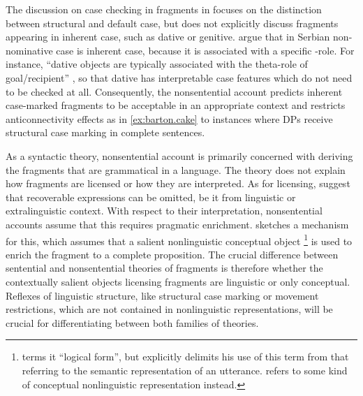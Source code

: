 The discussion on case checking in fragments in \citet{barton.progovac2005} focuses on the distinction between structural and default case, but does not explicitly discuss fragments appearing in inherent case, such as dative or genitive. \citet[338--341]{progovac.etal2006} argue that in Serbian non-nominative case is inherent case, because it is associated with a specific \texttheta-role. For instance, ``dative objects are typically associated with the theta-role of goal/recipient'' \citep[339]{progovac.etal2006}, so that dative has interpretable case features which do not need to be checked at all. Consequently, the nonsentential account predicts inherent case-marked fragments to be acceptable in an appropriate context and restricts anticonnectivity effects as in \ref{ex:barton.cake} to instances where DPs receive structural case marking in complete sentences.

As a syntactic theory,  nonsentential account is primarily concerned with deriving the fragments that are grammatical in a language. The theory does not explain how fragments are licensed or how they are interpreted. As for licensing, \citet[89]{barton.progovac2005} suggest that recoverable expressions can be omitted, be it from linguistic or extralinguistic context. With respect to their interpretation, nonsentential accounts assume that this requires pragmatic enrichment. \citet{stainton2006} sketches a mechanism for this, which assumes that a salient nonlinguistic conceptual object%
%
\footnote{\citet[186--189]{stainton2006} terms it ``logical form'', but explicitly delimits his use of this term from that referring to the semantic representation of an utterance. \citeauthor{stainton2006} refers to some kind of conceptual nonlinguistic representation instead.}\afterfn%
%
is used to enrich the fragment to a complete proposition. The crucial difference between sentential and nonsentential theories of fragments is therefore whether the contextually salient objects licensing fragments are linguistic or only conceptual. Reflexes of linguistic structure, like structural case marking or movement restrictions, which are not contained in nonlinguistic representations, will be crucial for differentiating between both families of theories.

